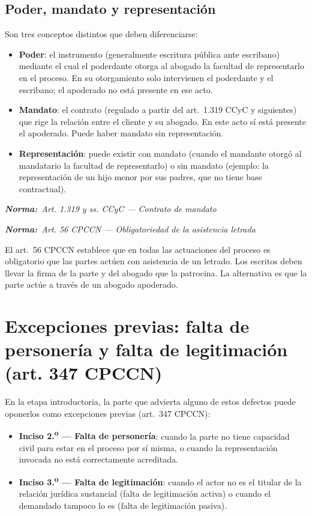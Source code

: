 \documentclass[12pt,oneside]{book}
\newcommand{\normaref}[1]{%
    \par\noindent\textbf{\textit{Norma:}}~\textit{#1}\par\vspace{0.2em}
}
\begin{document}
\subsection{Poder, mandato y representación}

Son tres conceptos distintos que deben diferenciarse:

\begin{itemize}
    \item \textbf{Poder}: el instrumento (generalmente escritura pública ante escribano) mediante el cual el poderdante otorga al abogado la facultad de representarlo en el proceso. En su otorgamiento solo intervienen el poderdante y el escribano; el apoderado no está presente en ese acto.
    \item \textbf{Mandato}: el contrato (regulado a partir del art.\ 1.319 CCyC y siguientes) que rige la relación entre el cliente y su abogado. En este acto sí está presente el apoderado. Puede haber mandato sin representación.
    \item \textbf{Representación}: puede existir con mandato (cuando el mandante otorgó al mandatario la facultad de representarlo) o sin mandato (ejemplo: la representación de un hijo menor por sus padres, que no tiene base contractual).
\end{itemize}

\normaref{Art. 1.319 y ss. CCyC --- Contrato de mandato}
\normaref{Art. 56 CPCCN --- Obligatoriedad de la asistencia letrada}

\begin{important}
El art.\ 56 CPCCN establece que en todas las actuaciones del proceso es obligatorio que las partes actúen con asistencia de un letrado. Los escritos deben llevar la firma de la parte y del abogado que la patrocina. La alternativa es que la parte actúe a través de un abogado apoderado.
\end{important}

\section{Excepciones previas: falta de personería y falta de legitimación (art. 347 CPCCN)}

En la etapa introductoria, la parte que advierta alguno de estos defectos puede oponerlos como excepciones previas (art.\ 347 CPCCN):

\begin{itemize}
    \item \textbf{Inciso 2.\textsuperscript{o} --- Falta de personería}: cuando la parte no tiene capacidad civil para estar en el proceso por sí misma, o cuando la representación invocada no está correctamente acreditada.
    \item \textbf{Inciso 3.\textsuperscript{o} --- Falta de legitimación}: cuando el actor no es el titular de la relación jurídica sustancial (falta de legitimación activa) o cuando el demandado tampoco lo es (falta de legitimación pasiva).
\end{itemize}
\end{document}
